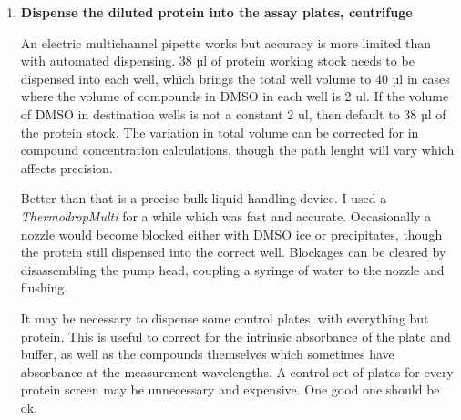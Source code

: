 \documentclass[16pt]{book}
\begin{document}
\begin{enumerate}
%
%
%

\item \textbf{Dispense the diluted protein into the assay plates, centrifuge}

	An electric multichannel pipette works but accuracy is more limited than with automated dispensing. 
	38 µl of protein working stock needs to be dispensed into each well, which brings the total well volume to 40 µl in cases where the volume of compounds in DMSO in each well is 2 ul.
	If the volume of DMSO in destination wells is not a constant 2 ul, then default to 38 µl of the protein stock.
	The variation in total volume can be corrected for in compound concentration calculations, though the path lenght will vary which affects precision.

	Better than that is a precise bulk liquid handling device.
	I used a \textit{ThermodropMulti} for a while which was fast and accurate.
	Occasionally a nozzle would become blocked either with DMSO ice or precipitates, though the protein still dispensed into the correct well.
	Blockages can be cleared by disassembling the pump head, coupling a syringe of water to the nozzle and flushing.

	It may be necessary to dispense some control plates, with everything but protein.
	This is useful to correct for the intrinsic absorbance of the plate and buffer, as well as the compounds themselves which sometimes have absorbance at the measurement wavelengths.
	A control set of plates for every protein screen may be unnecessary and expensive. 
	One good one should be ok.


\end{enumerate}
\end{document}
